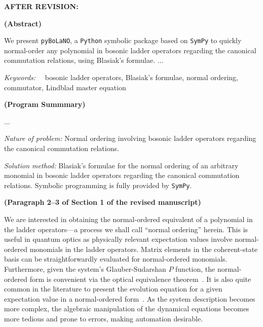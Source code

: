 \documentclass[12pt, a4paper]{article}
\newenvironment{revision}{%
\color{red}
}
{}
\newenvironment{revpost}{%
\textbf{{AFTER REVISION:}}
\par
}
{}
\begin{document}
%

\begin{revpost}

\textbf{(Abstract)}

We present \texttt{pyBoLaNO}, a \texttt{Python} symbolic package based on \texttt{SymPy} to quickly normal-order any polynomial in bosonic ladder operators \begin{revision}regarding the canonical commutation relations, using Blasiak's formulae\end{revision}. $\dots$

\textit{Keywords:}$\quad$ bosonic ladder operators, \begin{revision}Blasiak's formulae\end{revision}, normal ordering, commutator, Lindblad master equation

\textbf{(Program Summmary)}

$\dots$

{\em Nature of problem:} Normal ordering involving bosonic ladder operators \begin{revision} regarding the canonical commutation relations. \end{revision}

{\em Solution method:} Blasiak's formulae for the normal ordering of an arbitrary monomial in bosonic ladder operators \begin{revision}regarding the canonical commutation relations.\end{revision} Symbolic programming is fully provided by \texttt{SymPy}.

\textbf{(Paragraph 2--3 of Section 1 of the revised manuscript)}

\begin{revision}We are interested in obtaining the normal-ordered equivalent of a polynomial in the ladder operators---a process we shall call ``normal ordering'' herein. This is useful in quantum optics as physically relevant expectation values involve normal-ordered monomials in the ladder operators. Matrix elements in the coherent-state basis can be straightforwardly evaluated for normal-ordered monomials. Furthermore, given the system's Glauber-Sudarshan $P$ function, the normal-ordered form is convenient via the optical equivalence theorem~\cite{gerry_introductory_2005, fox2006quantum}. It is also quite common in the literature to present the evolution equation for a given expectation value in a normal-ordered form~\cite{chia_relaxation_2020, Shen2023, downing_hyperbolic_2024, Krimer2019, Zens2019, Ahmadi2024, Downing2021, Downing2022, Downing2023, BenArosh2021, Amitai2018.PhysRevE.97.052203, Minganti2019, Chimczak2023, Farina2019, Zhang2021}.\end{revision} As the system description becomes more complex, the algebraic manipulation of the dynamical equations becomes more tedious and prone to errors, making automation desirable.


\end{revpost}
\end{document}
